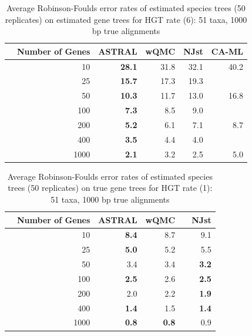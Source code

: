 \begin{table}[h!]
\caption[Error rates of estimated species trees (50 replicates)  on estimated gene trees for HGT rate 6]{Average Robinson-Foulds error rates of estimated species trees (50 replicates)  on estimated gene trees for HGT rate (6): 51 taxa, 1000 bp true alignments}
\begin{tabular}{rrrrrr}
 & Number of Genes & ASTRAL & wQMC  & NJst & CA-ML\\
\hline
 & 10 & \textbf{28.1} & 31.8 &   32.1 & 40.2 \\
 & 25 & \textbf{15.7} & 17.3 &   19.3 & \\
 & 50 & \textbf{10.3} & 11.7 &   13.0 & 16.8\\
 & 100 & \textbf{7.3} & 8.5 &   9.0 & \\
 & 200 & \textbf{5.2} & 6.1 &   7.1 & 8.7 \\
 & 400 & \textbf{3.5} & 4.4 &   4.0 & \\
 & 1000 & \textbf{2.1} & 3.2  & 2.5 & 5.0\\
\end{tabular}
\label{hgt::table6}
\end{table}



\begin{table}[h!]
\caption[Error rates of estimated species trees (50 replicates)  on true gene trees for HGT rate 1]{Average Robinson-Foulds error rates of estimated species trees (50 replicates)  on true gene trees for HGT rate (1): 51 taxa, 1000 bp true alignments}
\begin{tabular}{rrrrrr}
 & Number of Genes & ASTRAL & wQMC &  & NJst\\
\hline
 & 10 & \textbf{8.4} & 8.7 &  & 9.1\\
 & 25 & \textbf{5.0} & 5.2 &  & 5.5\\
 & 50 & 3.4 & 3.4 &  & \textbf{3.2} \\
 & 100 & \textbf{2.5} & 2.6 &  & \textbf{2.5} \\
 & 200 & 2.0 & 2.2 &  & \textbf{1.9}\\
 & 400 & \textbf{1.4} & 1.5 &  & \textbf{1.4} \\
 & 1000 & \textbf{0.8} & \textbf{0.8} &  & 0.9\\
\end{tabular}
\label{hgt::table7}
\end{table}

